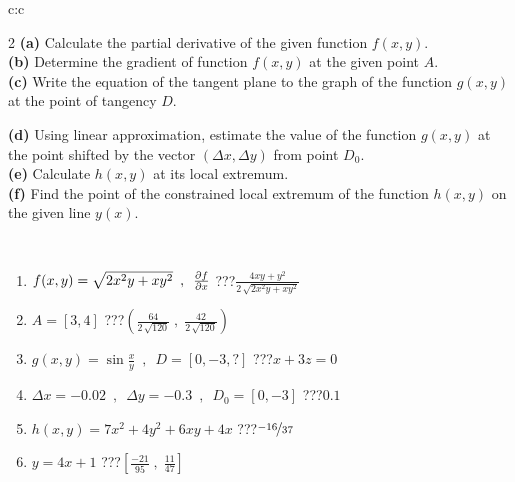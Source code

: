 \documentclass[10pt]{report}
\begin{document}
\begin{tabular}{c:c}
\begin{minipage}[c][104.5mm][t]{0.5\linewidth}
\begin{center}
\begin{minipage}{0.95\linewidth}
\begin{center}
{\begin{multicols}{2}
\textbf{(a)} Calculate the partial derivative of the given function \(f(x,y)\). \\[1mm]
\textbf{(b)} Determine the gradient of function \(f(x,y)\) at the given point \(A\). \\[1mm]
\textbf{(c)} Write the equation of the tangent plane to the graph of the function \(g(x,y)\) at the point of tangency \(D\). \par \columnbreak
\textbf{(d)} Using linear approximation, estimate the value of the function \(g(x,y)\) at the point shifted by the vector \((\Delta x, \Delta y)\) from point \(D_0\). \\[1mm]
\textbf{(e)} Calculate \(h(x,y)\) at its local extremum. \\[1mm]
\textbf{(f)} Find the point of the constrained local extremum of the function \(h(x,y)\) on the given line \(y(x)\). \\[1mm]
\end{multicols}
}
\end{center}
\end{minipage}
\\[4mm]
\begin{minipage}{0.79\linewidth}
\begin{center}
\begin{varwidth}{\linewidth}
\begin{enumerate}
\normalsizerr
\item $f(x,y) = \sqrt{2x^2y + xy^2}\enspace , \enspace \pdv{f}{x}$\quad \dotfill\; ???\;\dotfill \quad $\frac{4xy+y^2}{2\,\sqrt{2x^2y+xy^2}}$
\item $A = [3, 4]$\quad \dotfill\; ???\;\dotfill \quad $\left( \frac{64}{2\,\sqrt{120}} \;,\; \frac{42}{2\,\sqrt{120}} \right)$
\item $g(x,y) = \sin\frac{x}{y} \enspace , \enspace D = [0, -3, ?]$\quad \dotfill\; ???\;\dotfill \quad $x+3z=0$
\item $\Delta x = {-0.02} \enspace,\enspace \Delta y = {-0.3} \enspace,\enspace D_0 = [0,-3]$\quad \dotfill\; ???\;\dotfill \quad $0.1$
\item $h(x,y) = 7x^2+4y^2+6xy+4x$\quad \dotfill\; ???\;\dotfill \quad $\nicefrac{-16}{37}$
\item $y = 4x+1$\quad \dotfill\; ???\;\dotfill \quad $\left[\frac{-21}{95}\;,\;\frac{11}{47}\right]$
\end{enumerate}
\end{varwidth}
\end{center}
\end{minipage}
\begin{minipage}{0.20\linewidth}

\end{minipage}
\end{center}
\end{minipage}
\end{tabular}
\end{document}
